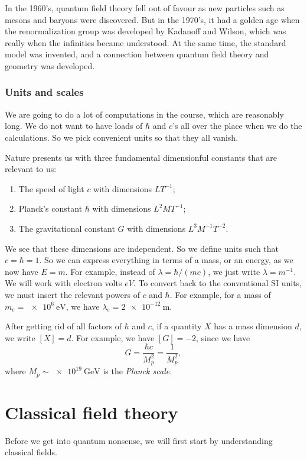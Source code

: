 \documentclass[a4paper]{article}
\begin{document}
In the 1960's, quantum field theory fell out of favour as new particles such as mesons and baryons were discovered. But in the 1970's, it had a golden age when the renormalization group was developed by Kadanoff and Wilson, which was really when the infinities became understood. At the same time, the standard model was invented, and a connection between quantum field theory and geometry was developed.

\subsubsection*{Units and scales}
We are going to do a lot of computations in the course, which are reasonably long. We do not want to have loads of $\hbar$ and $c$'s all over the place when we do the calculations. So we pick convenient units so that they all vanish.

Nature presents us with three fundamental dimensionful constants that are relevant to us:
\begin{enumerate}
  \item The speed of light $c$ with dimensions $LT^{-1}$;
  \item Planck's constant $\hbar$ with dimensions $L^2 MT^{-1}$;
  \item The gravitational constant $G$ with dimensions $L^3 M^{-1} T^{-2}$.
\end{enumerate}
We see that these dimensions are independent. So we define units such that $c = \hbar = 1$. So we can express everything in terms of a mass, or an energy, as we now have $E = m$. For example, instead of $\lambda = \hbar/(mc)$, we just write $\lambda = m^{-1}$. We will work with electron volts $eV$. To convert back to the conventional SI units, we must insert the relevant powers of $c$ and $\hbar$. For example, for a mass of $m_e = \SI{e6}\electronvolt$, we have $\lambda_e = \SI{2e-12}{\meter}$.

After getting rid of all factors of $\hbar$ and $c$, if a quantity $X$ has a mass dimension $d$, we write $[X] = d$. For example, we have $[G] = - 2$, since we have
\[
  G = \frac{\hbar c}{M_p^2} = \frac{1}{M_p^2},
\]
where $M_p \sim \SI{e19}{\giga\electronvolt}$ is the \emph{Planck scale}.

\section{Classical field theory}
Before we get into quantum nonsense, we will first start by understanding classical fields.
\end{document}
